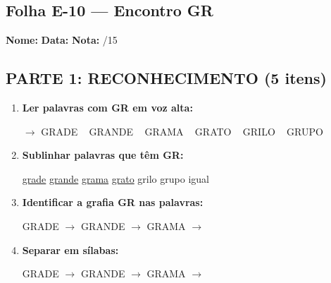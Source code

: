 \subsection{Folha E-10 --- Encontro GR}
\begin{exercicio}



\noindent\textbf{Nome:} \underline{\hspace{3.2cm}} \quad \textbf{Data:} \underline{\hspace{1.6cm}} \quad \textbf{Nota:} \underline{\hspace{0.9cm}}/15


\subsection*{PARTE 1: RECONHECIMENTO (5 itens)}

\begin{enumerate}

  \item \textbf{Ler palavras com GR em voz alta:}
  \begin{center}
  $\rightarrow$ GRADE ~ GRANDE ~ GRAMA ~ GRATO ~ GRILO ~ GRUPO
  \end{center}

  \item \textbf{Sublinhar palavras que têm GR:}

\begin{center}
  \uline{grade} \quad \uline{grande} \quad \uline{grama} \quad \uline{grato} \quad grilo \quad grupo \quad igual
\end{center}

  \item \textbf{Identificar a grafia GR nas palavras:}
  \begin{center}
  GRADE $\rightarrow$ \underline{\hspace{1cm}} \quad GRANDE $\rightarrow$ \underline{\hspace{1cm}} \quad GRAMA $\rightarrow$ \underline{\hspace{1cm}}
  \end{center}

  \item \textbf{Separar em sílabas:}
  \begin{center}
  GRADE $\rightarrow$ \underline{\hspace{1.2cm}} \quad GRANDE $\rightarrow$ \underline{\hspace{1.2cm}} \quad GRAMA $\rightarrow$ \underline{\hspace{1.2cm}}
  \end{center}


\end{enumerate}
\end{exercicio}
